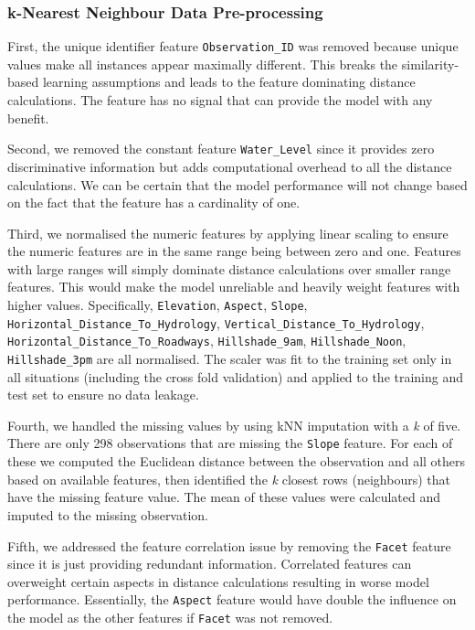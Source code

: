 \documentclass[10pt, conference]{IEEEtran}
\begin{document}
\subsubsection{k-Nearest Neighbour Data Pre-processing}
First, the unique identifier feature \texttt{Observation\_ID} was removed because unique values make all instances appear maximally different. This breaks the similarity-based learning assumptions and leads to the feature dominating distance calculations. The feature has no signal that can provide the model with any benefit.

Second, we removed the constant feature \texttt{Water\_Level} since it provides zero discriminative information but adds computational overhead to all the distance calculations. We can be certain that the model performance will not change based on the fact that the feature has a cardinality of one.

Third, we normalised the numeric features by applying linear scaling to ensure the numeric features are in the same range being between zero and one. Features with large ranges will simply dominate distance calculations over smaller range features. This would make the model unreliable and heavily weight features with higher values. Specifically, \texttt{Elevation}, \texttt{Aspect}, \texttt{Slope}, \texttt{Horizontal\_Distance\_To\_Hydrology}, \texttt{Vertical\_Distance\_To\_Hydrology}, \texttt{Horizontal\_Distance\_To\_Roadways}, \texttt{Hillshade\_9am}, \texttt{Hillshade\_Noon}, \texttt{Hillshade\_3pm}
 are all normalised. The scaler was fit to the training set only in all situations (including the cross fold validation) and applied to the training and test set to ensure no data leakage.
 
 Fourth, we handled the missing values by using kNN imputation with a \textit{k} of five. There are only 298 observations that are missing the \texttt{Slope} feature. For each of these we computed the Euclidean distance between the observation and all others based on available features, then identified the \textit{k} closest rows (neighbours) that have the missing feature value. The mean of these values were calculated and imputed to the missing observation.
 
 Fifth, we addressed the feature correlation issue by removing the \texttt{Facet} feature since it is just providing redundant information. Correlated features can overweight certain aspects in distance calculations resulting in worse model performance. Essentially, the \texttt{Aspect} feature would have double the influence on the model as the other features if \texttt{Facet} was not removed.
 
\end{document}
